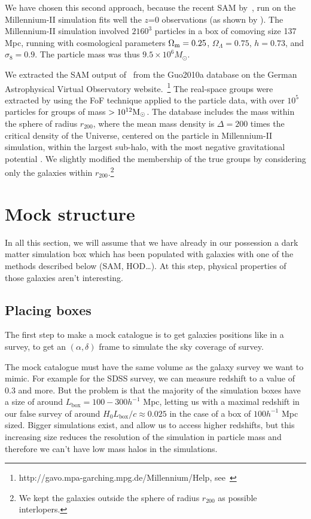 We have chosen this second approach, because the recent SAM by~\cite{Guo+11},
run on the Millennium-II simulation \citep{BoylanKolchin+09} fits well the
$z$=0 observations (as shown by \citeauthor{Guo+11}). The Millennium-II
simulation  involved $2160^3$ particles in a box of comoving size 137 Mpc,
running with cosmological parameters $\Omega_{\rm m}=0.25$,
$\Omega_\Lambda=0.75$, $h=0.73$, and $\sigma_8=0.9$. The particle mass was thus
$9.5\times 10^6 M_\odot$.

We extracted the SAM output of~\cite{Guo+11} from the Guo2010a database on the
German Astrophysical Virtual Observatory
website.~\footnote{http://gavo.mpa-garching.mpg.de/Millennium/Help,
see~\cite{Lemson06}} The real-space groups were extracted by
\citeauthor{Guo+11} using the FoF technique applied to the particle data, with
over $10^5$ particles for groups of mass $>10^{12} \rm M_\odot$. The database
includes the mass within the sphere of radius $r_{200}$, where the mean mass
density is $\Delta=200$ times the critical density of the Universe, centered on
the particle in Millennium-II simulation, within the largest sub-halo, with the
most negative gravitational potential \citep{BoylanKolchin+09}. We slightly
modified the membership of the true groups by considering only the galaxies
within $r_{200}$.\footnote{We kept the galaxies outside the sphere of radius
$r_{200}$ as possible interlopers.}

\section{Mock structure}

In all this section, we will assume that we have already in our possession a
dark matter simulation box which has been populated with galaxies with one of
the methods described below (SAM, HOD\ldots). At this step, physical properties
of those galaxies aren't interesting.

\subsection{Placing boxes}

The first step to make a mock catalogue is to get galaxies positions like in a
survey, to get an $(\alpha,\delta)$ frame to simulate the sky coverage of
survey.

The mock catalogue must have the same volume as the galaxy survey we want to
mimic. For example for the SDSS survey, we can measure redshift to a value of
0.3 and more. But the problem is that the majority of the simulation boxes have
a size of around $L_{\mathrm{box}}=100-300 h^{-1}$ Mpc, letting us with a
maximal redshift in our false survey of around
${H_0}{L_{\mathrm{box}}}/c\approx 0.025$ in the case of a box of $100 h^{-1}$
Mpc sized. Bigger simulations exist, and allow us to access higher redshifts,
but this increasing size reduces the resolution of the simulation in particle
mass and therefore we can't have low mass halos in the simulations.

